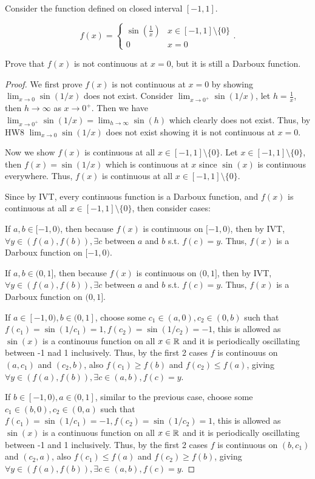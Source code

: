\documentclass{homework}
\newcommand{\R}{\bb{R}} %
\newcommand{\?}{\stackrel{?}{=}}
\theoremstyle{definition}
\begin{document}
\question[1] Consider the function defined on closed interval $[-1,1]$.

\[f(x)=\begin{cases}
    \sin(\frac1x) & x\in[-1,1]\setminus\{0\}\\
    0 & x=0
\end{cases}.\]

Prove that $f(x)$ is not continuous at $x=0$, but it is still a Darboux function.

\begin{proof}
    We first prove $f(x)$ is not continuous at $x=0$ by showing $\displaystyle\lim_{x\to0}\sin(1/x)$ does not exist. Consider $\displaystyle\lim_{x\to0^+}\sin(1/x)$, let $h=\frac1x$, then $h\to\infty$ as $x\to0^+$. Then we have $\displaystyle\lim_{x\to0^+}\sin(1/x)=\displaystyle\lim_{h\to\infty}\sin(h)$ which clearly does not exist. Thus, by HW8 $\displaystyle\lim_{x\to0}\sin(1/x)$ does not exist showing it is not continuous at $x=0$.

    Now we show $f(x)$ is continuous at all $x\in[-1,1]\setminus\{0\}$. Let $x\in[-1,1]\setminus\{0\}$, then $f(x)=\sin(1/x)$ which is continuous at $x$ since $\sin(x)$ is continuous everywhere. Thus, $f(x)$ is continuous at all $x\in[-1,1]\setminus\{0\}$.

    Since by IVT, every continuous function is a Darboux function, and $f(x)$ is continuous at all $x\in[-1,1]\setminus\{0\}$, then consider cases:

    If $a,b\in[-1,0)$, then because $f(x)$ is continuous on $[-1,0)$, then by IVT, $\forall y\in(f(a),f(b)), \exists c$ between $a$ and $b$ s.t. $f(c)=y$. Thus, $f(x)$ is a Darboux function on $[-1,0)$.

    If $a,b\in(0,1]$, then because $f(x)$ is continuous on $(0,1]$, then by IVT, $\forall y\in(f(a),f(b)), \exists c$ between $a$ and $b$ s.t. $f(c)=y$. Thus, $f(x)$ is a Darboux function on $(0,1]$.

    If $a\in[-1,0), b\in(0, 1]$, choose some $c_1\in(a,0), c_2\in(0,b)$ such that $f(c_1)=\sin(1/c_1)=1, f(c_2)=\sin(1/c_2)=-1$, this is allowed as $\sin(x)$ is a continouus function on all $x\in\R$ and it is periodically oscillating between -1 nad 1 inclusively. Thus, by the first 2 cases $f$ is continouus on $(a,c_1)$ and $(c_2,b)$, also $f(c_1)\geq f(b)$ and $f(c_2)\leq f(a)$, giving $\forall y\in(f(a),f(b)),\exists c\in (a,b), f(c)=y$.

    If $b\in[-1,0), a\in(0, 1]$, similar to the previous case, choose some $c_1\in(b,0), c_2\in(0,a)$ such that $f(c_1)=\sin(1/c_1)=-1, f(c_2)=\sin(1/c_2)=1$, this is allowed as $\sin(x)$ is a continuous function on all $x\in\R$ and it is periodically oscillating between -1 and 1 inclusively. Thus, by the first 2 cases $f$ is continuous on $(b,c_1)$ and $(c_2,a)$, also $f(c_1)\leq f(a)$ and $f(c_2)\geq f(b)$, giving $\forall y\in(f(a),f(b)),\exists c\in(a,b), f(c)=y$.


\end{proof}
\end{document}
